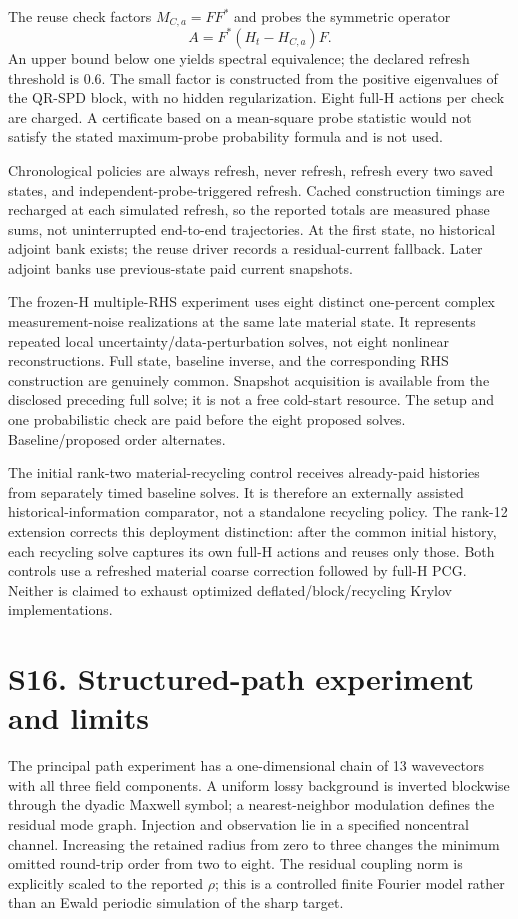 The reuse check factors \(M_{C,a}=FF^*\) and probes the symmetric operator
\[
A=F^*(H_t-H_{C,a})F.
\]
An upper bound below one yields spectral equivalence; the declared refresh threshold is 0.6. The small factor is constructed from the positive eigenvalues of the QR-SPD block, with no hidden regularization. Eight full-H actions per check are charged. A certificate based on a mean-square probe statistic would not satisfy the stated maximum-probe probability formula and is not used.

Chronological policies are always refresh, never refresh, refresh every two saved states, and independent-probe-triggered refresh. Cached construction timings are recharged at each simulated refresh, so the reported totals are measured phase sums, not uninterrupted end-to-end trajectories. At the first state, no historical adjoint bank exists; the reuse driver records a residual-current fallback. Later adjoint banks use previous-state paid current snapshots.

The frozen-H multiple-RHS experiment uses eight distinct one-percent complex measurement-noise realizations at the same late material state. It represents repeated local uncertainty/data-perturbation solves, not eight nonlinear reconstructions. Full state, baseline inverse, and the corresponding RHS construction are genuinely common. Snapshot acquisition is available from the disclosed preceding full solve; it is not a free cold-start resource. The setup and one probabilistic check are paid before the eight proposed solves. Baseline/proposed order alternates.

The initial rank-two material-recycling control receives already-paid histories from separately timed baseline solves. It is therefore an externally assisted historical-information comparator, not a standalone recycling policy. The rank-12 extension corrects this deployment distinction: after the common initial history, each recycling solve captures its own full-H actions and reuses only those. Both controls use a refreshed material coarse correction followed by full-H PCG. Neither is claimed to exhaust optimized deflated/block/recycling Krylov implementations.

\section*{S16. Structured-path experiment and limits}
The principal path experiment has a one-dimensional chain of 13 wavevectors with all three field components. A uniform lossy background is inverted blockwise through the dyadic Maxwell symbol; a nearest-neighbor modulation defines the residual mode graph. Injection and observation lie in a specified noncentral channel. Increasing the retained radius from zero to three changes the minimum omitted round-trip order from two to eight. The residual coupling norm is explicitly scaled to the reported \(\rho\); this is a controlled finite Fourier model rather than an Ewald periodic simulation of the sharp target.

